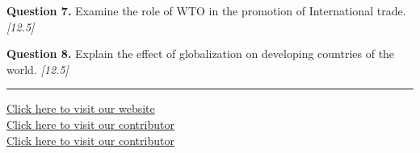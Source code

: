 \documentclass[11pt,a4paper]{article}
\newcommand{\pts}[1]{\hfill   \textit{[#1]}}
\begin{document}
\medskip


\noindent   \textbf{Question 7.} Examine the role of WTO in the promotion of International trade. \pts{12.5}

\medskip


\noindent   \textbf{Question 8.} Explain the effect of globalization on developing countries of the world. \pts{12.5}

\vfill\rule{\linewidth}{0.4pt}

\begin{center}\small
\href{https://bhu-exam.vercel.app/}{Click here to visit our website}\\[4pt]
\href{https://me-aryan.vercel.app/}{Click here to visit our contributor}\\[4pt]
\href{https://quashan-me.vercel.app/}{Click here to visit our contributor}
\end{center}
\end{document}
